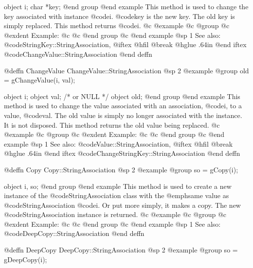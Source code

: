object  i;
char    *key;
@end group
@end example
This method is used to change the key associated with instance @code{i}.
@code{key} is the new key.  The old key is simply replaced.  This method
returns @code{i}.
@c @example
@c @group
@c @exdent Example:
@c 
@c @end group
@c @end example
@sp 1
See also:  @code{StringKey::StringAssociation,}
@iftex
@hfil @break @hglue .64in      
@end iftex
@code{ChangeValue::StringAssociation}
@end deffn











@deffn {ChangeValue} ChangeValue::StringAssociation
@sp 2
@example
@group
old = gChangeValue(i, val);

object  i;
object  val;    /*  or NULL   */
object  old;
@end group
@end example
This method is used to change the value associated with an association,
@code{i}, to a value, @code{val}.  The old value is simply no longer
associated with the instance.  It is not disposed.  This method
returns the old value being replaced.
@c @example
@c @group
@c @exdent Example:
@c 
@c @end group
@c @end example
@sp 1
See also:  @code{Value::StringAssociation,}
@iftex
@hfil @break @hglue .64in      
@end iftex
@code{ChangeStringKey::StringAssociation}
@end deffn















@deffn {Copy} Copy::StringAssociation
@sp 2
@example
@group
so = gCopy(i);

object  i, so;
@end group
@end example
This method is used to create a new instance of the
@code{StringAssociation} class with the @emph{same} value as
@code{StringAssociation} @code{i}.  Or put more simply, it makes a copy.
The new @code{StringAssociation} instance is returned.
@c @example
@c @group
@c @exdent Example:
@c 
@c @end group
@c @end example
@sp 1
See also:  @code{DeepCopy::StringAssociation}
@end deffn













@deffn {DeepCopy} DeepCopy::StringAssociation
@sp 2
@example
@group
so = gDeepCopy(i);

